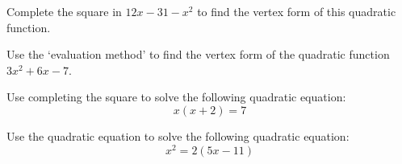 \documentclass[11pt,letterpaper]{article}
\begin{document}

 Complete the square in $12x - 31 - x^2$ to find the vertex form of this quadratic function. 



\newpage



 Use the `evaluation method' to find the vertex form of the quadratic function $3x^2 + 6x - 7$. 



\newpage



 Use completing the square to solve the following quadratic equation: 
	\[
	x(x + 2)= 7
	\]



\newpage



 Use the quadratic equation to solve the following quadratic equation:
	\[
	x^2= 2(5x - 11)
	\]
\end{document}
